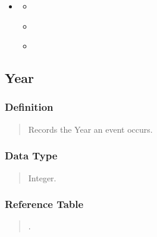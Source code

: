 \documentclass[letterpaper,10pt,english]{sphinxmanual}
\begin{document}
\begin{sphinxShadowBox}
\begin{itemize}
\begin{itemize}
\end{itemize}

\item {} 
\sphinxAtStartPar
{}\label{\detokenize{schema_tables:id260}}{\hyperref[\detokenize{schema_tables:id}]{}}
\begin{itemize}
\item {} 
\sphinxAtStartPar
{}\label{\detokenize{schema_tables:id261}}{\hyperref[\detokenize{schema_tables:id88}]{}}

\item {} 
\sphinxAtStartPar
{}\label{\detokenize{schema_tables:id262}}{\hyperref[\detokenize{schema_tables:id89}]{}}

\item {} 
\sphinxAtStartPar
{}\label{\detokenize{schema_tables:id263}}{\hyperref[\detokenize{schema_tables:id90}]{}}

\end{itemize}

\end{itemize}
\end{sphinxShadowBox}


\subsection{Year}
\label{\detokenize{schema_tables:year}}

\subsubsection{Definition}
\label{\detokenize{schema_tables:definition}}\begin{quote}

\sphinxAtStartPar
Records the Year an event occurs.
\end{quote}


\subsubsection{Data Type}
\label{\detokenize{schema_tables:data-type}}\begin{quote}

\sphinxAtStartPar
Integer.
\end{quote}


\subsubsection{Reference Table}
\label{\detokenize{schema_tables:reference-table}}\begin{quote}

\sphinxAtStartPar
{\hyperref[\detokenize{schema_tables:overview-table}]{}}.
\end{quote}
\end{document}
